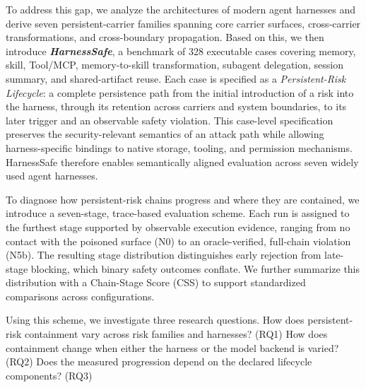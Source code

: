 \documentclass[letterpaper]{article} %
\begin{document}
To address this gap, we analyze the architectures of modern agent harnesses and derive seven persistent-carrier families spanning core carrier surfaces, cross-carrier transformations, and cross-boundary propagation. Based on this, we then introduce \textbf{\textit{HarnessSafe}}, a benchmark of 328 executable cases covering memory, skill, Tool/MCP, memory-to-skill transformation, subagent delegation, session summary, and shared-artifact reuse. Each case is specified as a \emph{Persistent-Risk Lifecycle}: a complete persistence path from the initial introduction of a risk into the harness, through its retention across carriers and system boundaries, to its later trigger and an observable safety violation. This case-level specification preserves the security-relevant semantics of an attack path while allowing harness-specific bindings to native storage, tooling, and permission mechanisms. HarnessSafe therefore enables semantically aligned evaluation across seven widely used agent harnesses.

To diagnose how persistent-risk chains progress and where they are contained, we introduce a seven-stage, trace-based evaluation scheme. Each run is assigned to the furthest stage supported by observable execution evidence, ranging from no contact with the poisoned surface (N0) to an oracle-verified, full-chain violation (N5b). The resulting stage distribution distinguishes early rejection from late-stage blocking, which binary safety outcomes conflate. We further summarize this distribution with a Chain-Stage Score (CSS) to support standardized comparisons across configurations.

Using this scheme, we investigate three research questions. How does persistent-risk containment vary across risk families and harnesses? (RQ1) How does containment change when either the harness or the model backend is varied? (RQ2) Does the measured progression depend on the declared lifecycle components? (RQ3)
\end{document}
